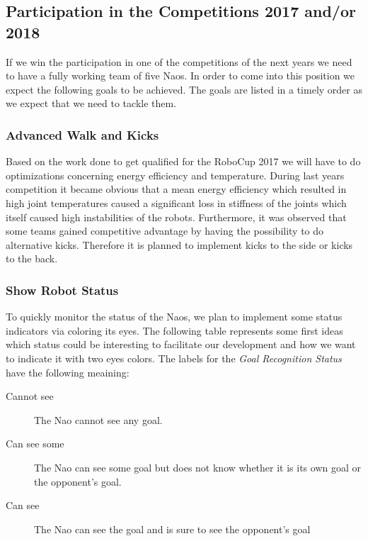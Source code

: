 \documentclass[12pt]{article}
\theoremstyle{definition}
\begin{document}
\subsection{Participation in the Competitions 2017 and/or 2018}
If we win the participation in one of the competitions of the next years we need to have a fully working team of five Naos. In order to come into this position we expect the following goals to be achieved. The goals are listed in a timely order as we expect that we need to tackle them.

\subsubsection{Advanced Walk and Kicks}
Based on the work done to get qualified for the RoboCup 2017 we will have to do optimizations concerning energy efficiency and temperature. During last years competition it became obvious that a mean energy efficiency which resulted in high joint temperatures caused a significant loss in stiffness of the joints which itself caused high instabilities of the robots. Furthermore, it was observed that some teams gained competitive advantage by having the possibility to do alternative kicks. Therefore it is planned to implement kicks to the side or kicks to the back.

\subsubsection{Show Robot Status}
To quickly monitor the status of the Naos, we plan to implement some status indicators via coloring its eyes. The following table represents some first ideas which status could be interesting to facilitate our development and how we want to indicate it with two eyes colors. The labels for the {\em Goal Recognition Status} have the following meaining:

\begin{description}
	\item [Cannot see] The Nao cannot see any goal.
	\item [Can see some] The Nao can see some goal but does not know whether it is its own goal or the opponent's goal.
	\item [Can see] The Nao can see the goal and is sure to see the opponent's goal
\end{description}
\end{document}
